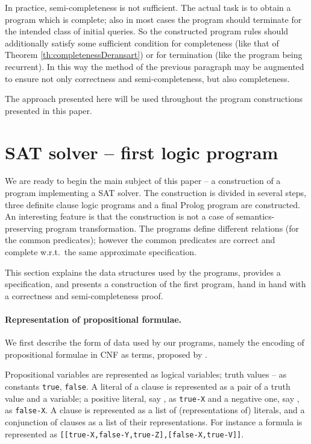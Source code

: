 \documentclass{tlp}
\begin{document}
In practice, semi-completeness is not sufficient.  The actual task is 
to obtain a program which is complete;  also in most cases the program should
terminate for the intended class of initial queries.   
So the constructed program rules
should additionally satisfy some sufficient condition
for completeness (like that of Theorem \ref{th:completenessDeransart}) or
for termination
(like the program being recurrent).
In this way the method of the previous paragraph may be augmented to ensure
not only correctness and semi-completeness, but also completeness. 


The approach presented here will be used throughout the program constructions
presented in this paper. 



\section{SAT solver -- first logic program}
\label{sec:logicProgram1}

We are ready to begin the main subject of this paper -- a construction of a
program implementing a SAT solver.
The construction is divided in several steps, three definite clause logic
programs and a final Prolog program are constructed.
An interesting feature is that the construction is not a case of
semantics-preserving program transformation. 
The programs define different relations (for
the common predicates); however the common predicates are correct and
complete w.r.t.\ the same approximate specification.

This section explains the data structures used by the programs, 
provides a specification, 
and presents a construction of the first program, hand in hand with 
a correctness and semi-completeness proof.








\paragraph{Representation of propositional formulae.}

We first describe the form of data used by our programs, namely
the encoding of propositional formulae in CNF as terms,
proposed by \cite{howe.king.tcs-shorter}.

Propositional variables are represented as logical variables;
truth values -- as constants {\tt true}, {\tt false}.
A literal of a clause is represented as a pair of a truth value and a variable;
a positive literal, say , as {\tt true-X}
and a negative one, say , as  {\tt false-X}.
A clause is represented as a list of (representations of) literals,
and a conjunction of clauses as a list of their representations.
For instance a formula
 is represented as 
{\tt[[true-X,false-Y,true-Z],[false-X,true-V]]}.
\end{document}
